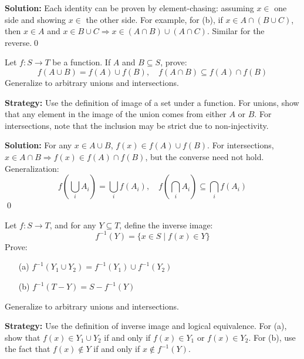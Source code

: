 \bigskip\noindent\textbf{Solution:}  
Each identity can be proven by element-chasing: assuming \( x \in \) one side and showing \( x \in \) the other side.  
For example, for (b), if \( x \in A \cap (B \cup C) \), then \( x \in A \) and \( x \in B \cup C \Rightarrow x \in (A \cap B) \cup (A \cap C) \). Similar for the reverse.\qed



\begin{problembox}
\begin{problemstatement}
Let \( f: S \to T \) be a function. If \( A \) and \( B \subseteq S \), prove:
\[
f(A \cup B) = f(A) \cup f(B), \quad f(A \cap B) \subseteq f(A) \cap f(B)
\]
Generalize to arbitrary unions and intersections.
\end{problemstatement}
\end{problembox}

\noindent\textbf{Strategy:} Use the definition of image of a set under a function. For unions, show that any element in the image of the union comes from either $A$ or $B$. For intersections, note that the inclusion may be strict due to non-injectivity.

\noindent\bigskip\noindent\textbf{Solution:}  
For any \( x \in A \cup B \), \( f(x) \in f(A) \cup f(B) \).  
For intersections, \( x \in A \cap B \Rightarrow f(x) \in f(A) \cap f(B) \), but the converse need not hold.  
Generalization:  
\[
f\left( \bigcup_i A_i \right) = \bigcup_i f(A_i), \quad f\left( \bigcap_i A_i \right) \subseteq \bigcap_i f(A_i)
\]\qed



\begin{problembox}
\begin{problemstatement}
Let \( f: S \to T \), and for any \( Y \subseteq T \), define the inverse image:
\[
f^{-1}(Y) = \{x \in S \mid f(x) \in Y \}
\]
Prove:
\begin{itemize}
\item[(a)] \( f^{-1}(Y_1 \cup Y_2) = f^{-1}(Y_1) \cup f^{-1}(Y_2) \)
\item[(b)] \( f^{-1}(T - Y) = S - f^{-1}(Y) \)
\end{itemize}
Generalize to arbitrary unions and intersections.
\end{problemstatement}
\end{problembox}

\noindent\textbf{Strategy:} Use the definition of inverse image and logical equivalence. For (a), show that $f(x) \in Y_1 \cup Y_2$ if and only if $f(x) \in Y_1$ or $f(x) \in Y_2$. For (b), use the fact that $f(x) \notin Y$ if and only if $x \notin f^{-1}(Y)$.

